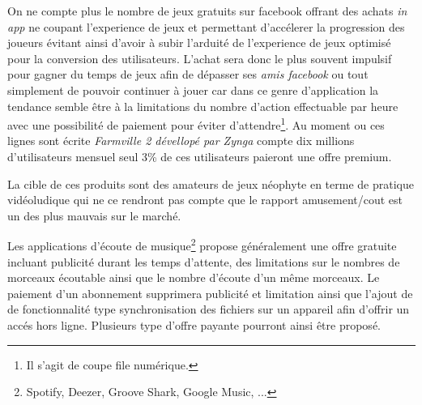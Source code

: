 \documentclass[11pt, a4paper ]{article}
\begin{document}
On ne compte plus le nombre de jeux gratuits sur facebook offrant des achats \emph{in app} ne coupant l'experience de jeux et permettant d'accélerer la progression des joueurs évitant ainsi d'avoir à subir l'arduité de l'experience de jeux optimisé pour la conversion des utilisateurs. L'achat sera donc le plus souvent impulsif pour gagner du temps de jeux afin de dépasser ses \emph{amis facebook} ou tout simplement de pouvoir continuer à jouer car dans ce genre d'application la tendance semble être à la limitations du nombre d'action effectuable par heure avec une possibilité de paiement pour éviter d'attendre\footnote{Il s'agit de coupe file numérique.}. Au moment ou ces lignes sont écrite \emph{Farmville 2 dévellopé par Zynga} compte dix millions d'utilisateurs mensuel seul 3\% de ces utilisateurs paieront une offre premium.


La cible de ces produits sont des amateurs de jeux néophyte en terme de pratique vidéoludique qui ne ce rendront pas compte que le rapport amusement/cout est un des plus mauvais sur le marché.

\subsubparagraph{}
Les applications d'écoute de musique\footnote{Spotify, Deezer, Groove Shark, Google Music, ...} propose généralement une offre gratuite incluant publicité durant les temps d'attente, des limitations sur le nombres de morceaux écoutable ainsi que le nombre d'écoute d'un même morceaux.
Le paiement d'un abonnement supprimera publicité et limitation ainsi que l'ajout de de fonctionnalité type synchronisation des fichiers sur un appareil afin d'offrir un accés hors ligne. Plusieurs type d'offre payante pourront ainsi être proposé.

\end{document}
